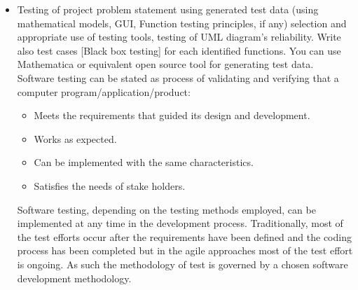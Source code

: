 \documentclass[12pt,a4paper]{report}
\begin{document}
\begin{appendices}
\begin{itemize}
	\item Testing of project problem statement using generated test data (using
	mathematical models, GUI, Function testing principles, if any) selection and appropriate use of testing tools, testing of UML diagram's
	reliability. Write also test cases [Black box testing] for each identified
	functions. You can use Mathematica or equivalent open source tool for generating test data.\\
	\hspace{0.5 in}Software testing can be stated as process of validating and verifying that a computer program/application/product:
	\begin{itemize}
		\item Meets the requirements that guided its design and development.
		\item Works as expected.
		\item Can be implemented with the same characteristics.
		\item Satisfies the needs of stake holders.
		
	\end{itemize}
	
	\hspace{0.5 in}Software testing, depending on the testing methods employed, can be implemented at any time in the development process. Traditionally, most of the test efforts occur after the requirements have been defined and the coding process has been completed but in the agile approaches most of the test effort is ongoing. As such the methodology of test is governed by a chosen software development methodology.
	

\end{itemize}
\end{appendices}
\end{document}
